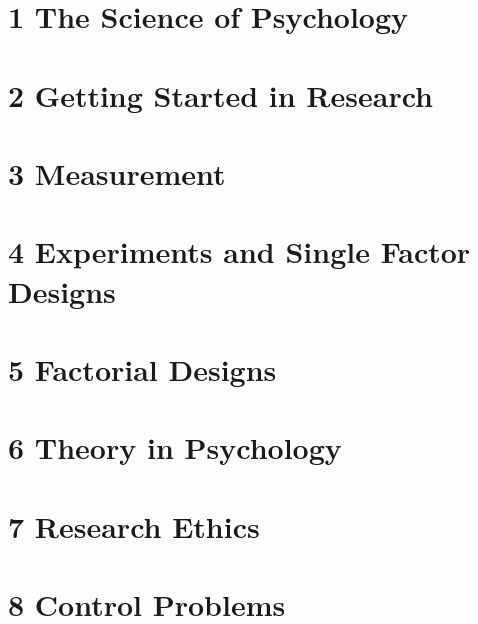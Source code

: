 \documentclass[oneside]{tufte-book}
\begin{document}
%


%

\chapter{1 The Science of Psychology}


\chapter{2 Getting Started in Research}


\chapter{3 Measurement}


\chapter{4 Experiments and Single Factor Designs}


\chapter{5 Factorial Designs}


\chapter{6 Theory in Psychology}


\chapter{7 Research Ethics}


\chapter{8 Control Problems}

\end{document}
